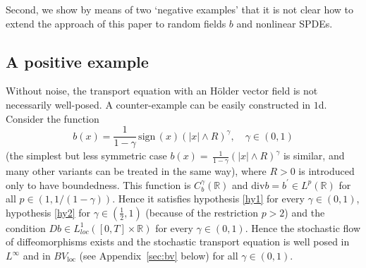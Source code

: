 \documentclass[a4paper,11pt]{article}
\begin{document}
Second, we show by means of two `negative examples' that it is not clear how
to extend the approach of this paper to random fields $b$ and nonlinear SPDEs.

\subsection{A positive example}

\label{sec:positive-example} Without noise, the transport equation with an
H\"{o}lder vector field is not necessarily well-posed. A counter-example can
be easily constructed in $1$d. Consider the function
\begin{equation*}
b(x)=\frac{1}{1-\gamma }\,\mathrm{sign}\,(x)\left( |x|\wedge R\right)
^{\gamma },\quad \gamma \in \left( 0,1\right)
\end{equation*}
(the simplest but less symmetric case $b(x)=\,\frac{1}{1-\gamma }\left(
|x|\wedge R\right) ^{\gamma }$ is similar, and many other variants can be
treated in the same way), where $R>0$ is introduced only to have
boundedness. This function is $C_{b}^{\gamma }\left( \mathbb{R}\right) $ and
$\mathrm{div}b=b^{\prime }\in L^{p}\left( \mathbb{R}\right) $ for all $p\in
\left( 1,1/\left( 1-\gamma \right) \right) $. Hence it satisfies hypothesis
\ref{hy1} for every $\gamma \in \left( 0,1\right) $, hypothesis \ref{hy2}
for $\gamma \in \left( \frac{1}{2},1\right) $ (because of the restriction $%
p>2$) and the condition $Db\in L_{loc}^{1}\left( \left[ 0,T\right] \times
\mathbb{R}\right) $ for every $\gamma \in \left( 0,1\right) $. Hence the
stochastic flow of diffeomorphisms exists and the stochastic transport
equation is well posed in $L^{\infty }$ and in $BV_{\text{loc}}$ (see Appendix~\ref{sec:bv} below) for all $\gamma \in
\left( 0,1\right) $.
\end{document}
